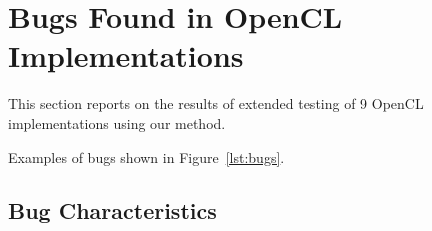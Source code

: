 \section{Bugs Found in OpenCL Implementations}

This section reports on the results of extended testing of 9 OpenCL implementations using our method.

Examples of bugs shown in Figure~\ref{lst:bugs}.




\subsection{Bug Characteristics}

